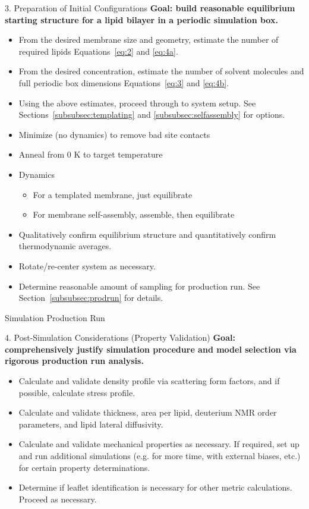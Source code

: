 \documentclass[9pt,bestpractices]{livecoms}
\begin{document}
\begin{Checklists*}[p!]
\begin{checklist}{3. Preparation of Initial Configurations}
\textbf{Goal: build reasonable equilibrium starting structure for a lipid bilayer in a periodic simulation box.}
\begin{itemize}
\item From the desired membrane size and geometry, estimate the number of required lipids Equations~\ref{eq:2} and \ref{eq:4a}.
\item From the desired concentration, estimate the number of solvent molecules and full periodic box dimensions Equations~\ref{eq:3} and \ref{eq:4b}.
\item Using the above estimates, proceed through to system setup. See Sections~\ref{subsubsec:templating} and \ref{subsubsec:selfassembly} for options.
\item Minimize (no dynamics) to remove bad site contacts
\item Anneal from 0 K to target temperature
\item Dynamics
	\begin{itemize}
	\item For a templated membrane, just equilibrate
	\item For membrane self-assembly, assemble, then equilibrate
	\end{itemize}
\item Qualitatively confirm equilibrium structure and quantitatively confirm thermodynamic averages.
\item Rotate/re-center system as necessary.
\item Determine reasonable amount of sampling for production run. See Section~\ref{subsubsec:prodrun} for details.
\end{itemize}
\end{checklist}

\begin{checklist}{Simulation Production Run}
\end{checklist}

\begin{checklist}{4. Post-Simulation Considerations (Property Validation)}
\textbf{Goal: comprehensively justify simulation procedure and model selection via rigorous production run analysis.}
\begin{itemize}
\item Calculate and validate density profile via scattering form factors, and if possible, calculate stress profile.
\item Calculate and validate thickness, area per lipid, deuterium NMR order parameters, and lipid lateral diffusivity.
\item Calculate and validate mechanical properties as necessary. If required, set up and run additional simulations (e.g. for more time, with external biases, etc.) for certain property determinations.
\item Determine if leaflet identification is necessary for other metric calculations. Proceed as necessary.
\end{itemize}
\end{checklist}

\end{Checklists*}
\end{document}
